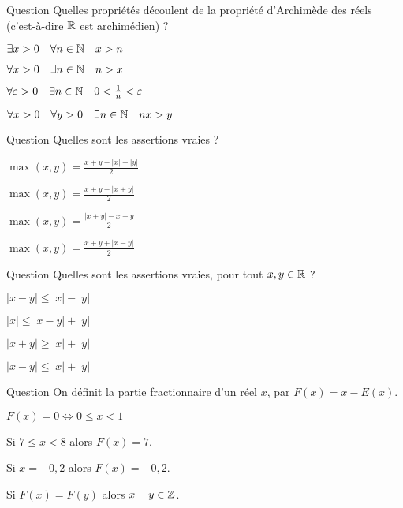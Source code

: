 \begin{multi}[multiple,feedback=
{La définition de la propriété d'Archimède est \(\forall x>0 \quad \exists n \in\Nn \quad n>x\). Cela implique les deux autres assertions vraies.
}]{Question}
Quelles propriétés découlent de la propriété d’Archimède des réels (c'est-à-dire \(\mathbb{R}\) est archimédien) ?

    \item \(\exists x>0 \quad \forall n \in\mathbb{N} \quad x>n\)
    \item* \(\forall x>0 \quad \exists n \in\Nn \quad n>x\)
    \item* \(\forall \varepsilon >0 \quad \exists n \in \mathbb{N} \quad 0 < \frac 1n < \varepsilon\)
    \item* \(\forall x>0 \quad \forall y>0 \quad \exists n \in \mathbb{N} \quad nx >y\)
\end{multi}


\begin{multi}[multiple,feedback=
{On prouve la formule \(\max(x,y) = \frac{x+y + |x-y|}{2}\) en distinguant le cas \(x-y \ge0\) puis \(x-y<0\).
}]{Question}
Quelles sont les assertions vraies ?

    \item \(\max(x,y) = \frac{x+y-|x|-|y|}{2}\)
    \item \(\max(x,y) = \frac{x+y-|x+y|}{2}\)
    \item \(\max(x,y) = \frac{|x+y|-x-y}{2}\)
    \item* \(\max(x,y) = \frac{x+y + |x-y|}{2}\)
\end{multi}


\begin{multi}[multiple,feedback=
{L'inégalité triangulaire est \(|x+y| \le |x| + |y|\). Les assertions vraies en découlent.
}]{Question}
Quelles sont les assertions vraies, pour tout \(x,y\in\mathbb{R}\) ?

    \item \(|x-y| \le |x|-|y|\)
    \item* \(|x| \le |x-y|+|y|\)
    \item \(|x+y| \ge |x| + |y|\)
    \item* \(|x-y| \le |x| + |y|\)
\end{multi}


\begin{multi}[multiple,feedback=
{La partie fractionnaire est égale à la partie "après la virgule".
Par exemple \(F(12,3456) = 0,3456\).
}]{Question}
On définit la partie fractionnaire d'un réel \(x\), par \(F(x) = x -E(x)\).

    \item \(F(x) = 0 \iff 0 \le x <1\)
    \item Si \(7 \le x <8\) alors \(F(x) = 7\).
    \item Si \(x=-0,2\) alors \(F(x) = -0,2\).
    \item* Si \(F(x)=F(y)\) alors \(x-y \in \mathbb{Z}\).
\end{multi}


